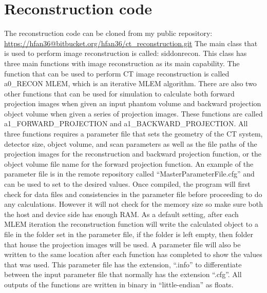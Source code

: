 \chapter{Reconstruction code}
The reconstruction code can be cloned from my public repository: \url{https://hfan36@bitbucket.org/hfan36/ct_reconstruction.git}
The main class that is used to perform image reconstruction is called: siddon\textunderscore recon.
This class has three main functions with image reconstruction as its main capability.  The function that can be used to perform CT image reconstruction is called a0\_RECON \textunderscore MLEM, which is an iterative MLEM algorithm.  There are also two other functions that can be used for simulation to calculate both forward projection images when given an input phantom volume and backward projection object volume when given a series of projection images.  These functions are called a1\_FORWARD\_PROJECTION and a1\_BACKWARD\_PROJECTION.  
All three functions requires a parameter file that sets the geometry of the CT system, detector size, object volume, and scan parameters as well as the file paths of the projection images for the reconstruction and backward projection function, or the object volume file name for the forward projection function.  An example of the parameter file is in the remote repository called ``MasterParameterFile.cfg'' and can be used to set to the desired values.  Once compiled, the program will first check for data files and consistencies in the parameter file before proceeding to do any calculations.  However it will not check for the memory size so make sure both the host and device side has enough RAM.  As a default setting, after each MLEM iteration the reconstruction function will write the calculated object to a file in the folder set in the parameter file, if the folder is left empty, then folder that house the projection images will be used.  A parameter file will also be written to the same location after each function has completed to show the values that was used.  This parameter file has the extension, ``.info'' to differentiate between the input parameter file that normally has the extension ``.cfg''. All outputs of the functions are written in binary in ``little-endian'' as floats.

